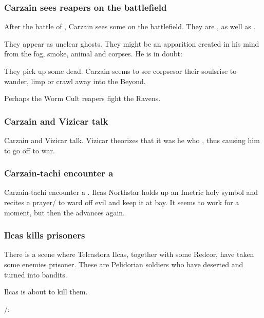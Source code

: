 \begin{garbage}
\subsubsection{Carzain sees reapers on the battlefield}
After the battle of \Forklin, Carzain sees some  on the battlefield. They are , as well as . 

They appear as unclear ghosts. They might be an apparition created in his mind from the fog, smoke, animal and corpses. He is in doubt: 

They pick up some dead. Carzain seems to see corpses\dash or their souls\dash rise to wander, limp or crawl away into the Beyond. 

Perhaps the Worm Cult reapers fight the Ravens. 





\subsubsection{Carzain and Vizicar talk}
Carzain and Vizicar talk. 
Vizicar theorizes that it was he who , thus causing him to go off to war. 





\subsubsection{Carzain-tachi encounter a \bane}
Carzain-tachi encounter a \bane. 
Ilcas Northstar holds up an Imetric holy symbol and recites a prayer/ to ward off evil and keep it at bay. 
It seems to work for a moment, but then the \bane{} advances again. 





\subsubsection{Ilcas kills prisoners}
There is a scene where Telcastora Ilcas, together with some Redcor, have taken some enemies prisoner. 
These are Pelidorian soldiers who have deserted and turned into bandits. 

Ilcas is about to kill them. 

\begin{prose}
  \Racel/\Esmerel: 
  

\end{prose}
\end{garbage}
